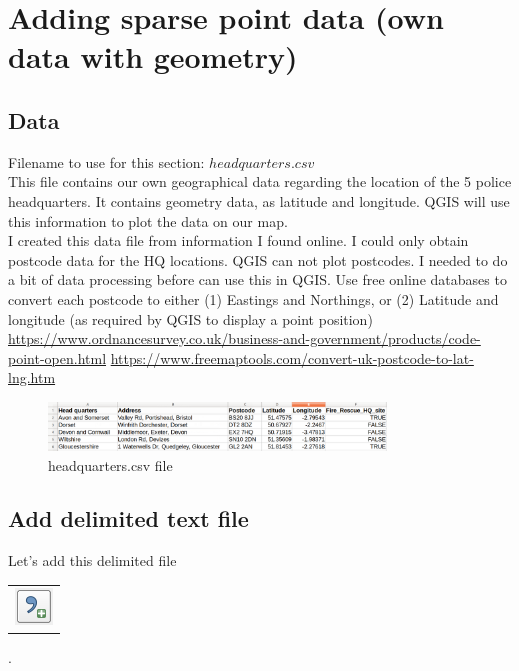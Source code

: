 \chapter{Adding sparse point data (own data with geometry)}

\pagestyle{fancy}
\fancyhf{}
\fancyhead[OC]{\leftmark}
\fancyhead[EC]{\rightmark}
\cfoot{\thepage}


\section{Data}
Filename to use for this section: $headquarters.csv$\\

This file contains our own geographical data regarding the location of the 5 police headquarters. It contains geometry data, as latitude and longitude. QGIS will use this information to plot the data on our map.\\

I created this data file from information I found online. I could only obtain postcode data for the HQ locations. QGIS can not plot postcodes. I needed to do a bit of data processing before can use this in QGIS.  Use free online databases to convert each postcode to either (1) Eastings and Northings, or (2) Latitude and longitude (as required by QGIS to display a point position)\\

\url{https://www.ordnancesurvey.co.uk/business-and-government/products/code-point-open.html}
\url{https://www.freemaptools.com/convert-uk-postcode-to-lat-lng.htm}

\begin{figure}[!h]
	\centering
	\includegraphics[width=0.8\textwidth]{images/headquarters_csv.png}
	\caption{headquarters.csv file}
	\label{ft_fig_firstfig3}
\end{figure}

\section{Add delimited text file}

Let's add this delimited file 
\begin{tabular}{@{}c@{}}\includegraphics[width=4ex]{images/add_delimited_text_layer_icon.png}\end{tabular}
.  

